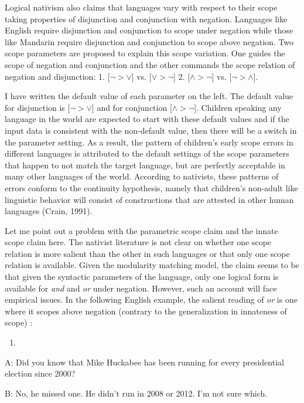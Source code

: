 \documentclass[oneside]{report}
\theoremstyle{definition}
\theoremstyle{definition}
\theoremstyle{definition}
\theoremstyle{remark}
\begin{document}
Logical nativism also claims that languages vary with respect to their
scope taking properties of disjunction and conjunction with negation.
Languages like English require disjunction and conjunction to scope
under negation while those like Mandarin require disjunction and
conjunction to scope above negation. Two scope parameters are proposed
to explain this scope variation. One guides the scope of negation and
conjunction and the other commands the scope relation of negation and
disjunction: 1. {[}\(\lnot > \lor\){]} vs. {[}\(\lor > \lnot\){]} 2.
{[}\(\land > \lnot\){]} vs. {[}\(\lnot > \land\){]}.

I have written the default value of each parameter on the left. The
default value for disjunction is {[}\(\lnot > \lor\){]} and for
conjunction {[}\(\land > \lnot\){]}. Children speaking any language in
the world are expected to start with these default values and if the
input data is consistent with the non-default value, then there will be
a switch in the parameter setting. As a result, the pattern of
children's early scope errors in different languages is attributed to
the default settings of the scope parameters that happen to not match
the target language, but are perfectly acceptable in many other
languages of the world. According to nativists, these patterns of errors
conform to the continuity hypothesis, namely that children's non-adult
like linguistic behavior will consist of constructions that are attested
in other human languages (Crain, 1991).

Let me point out a problem with the parametric scope claim and the
innate scope claim here. The nativist literature is not clear on whether
one scope relation is more salient than the other in such languages or
that only one scope relation is available. Given the modularity matching
model, the claim seems to be that given the syntactic parameters of the
language, only one logical form is available for \emph{and} and
\emph{or} under negation. However, such an account will face empirical
issues. In the following English example, the salient reading of
\emph{or} is one where it scopes above negation (contrary to the
generalization in innateness of scope) :
\begin{enumerate}
\def\labelenumi{(\arabic{enumi})}
\setcounter{enumi}{14}
\item
\end{enumerate}
A: Did you know that Mike Huckabee has been running for every
presidential election since 2000?

B: No, he missed one. He didn't run in 2008 or 2012. I'm not sure which.
\end{document}
